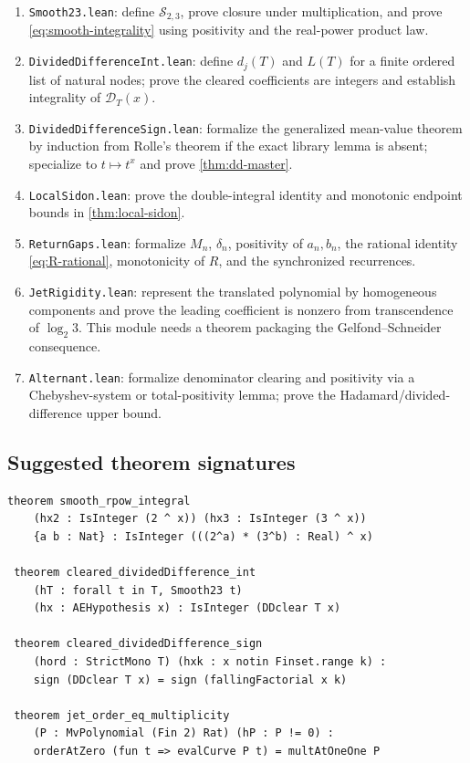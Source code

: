 \documentclass[11pt]{article}
\theoremstyle{definition}
\theoremstyle{remark}
\newcommand{\Ssmooth}{\mathcal S_{2,3}}
\begin{document}
\begin{enumerate}
\item \texttt{Smooth23.lean}: define $\Ssmooth$, prove closure under multiplication, and prove \eqref{eq:smooth-integrality} using positivity and the real-power product law.
\item \texttt{DividedDifferenceInt.lean}: define $d_j(T)$ and $L(T)$ for a finite ordered list of natural nodes; prove the cleared coefficients are integers and establish integrality of $\mathscr D_T(x)$.
\item \texttt{DividedDifferenceSign.lean}: formalize the generalized mean-value theorem by induction from Rolle's theorem if the exact library lemma is absent; specialize to $t\mapsto t^x$ and prove \cref{thm:dd-master}.
\item \texttt{LocalSidon.lean}: prove the double-integral identity and monotonic endpoint bounds in \cref{thm:local-sidon}.
\item \texttt{ReturnGaps.lean}: formalize $M_n$, $\delta_n$, positivity of $a_n,b_n$, the rational identity \eqref{eq:R-rational}, monotonicity of $R$, and the synchronized recurrences.
\item \texttt{JetRigidity.lean}: represent the translated polynomial by homogeneous components and prove the leading coefficient is nonzero from transcendence of $\log_2 3$. This module needs a theorem packaging the Gelfond--Schneider consequence.
\item \texttt{Alternant.lean}: formalize denominator clearing and positivity via a Chebyshev-system or total-positivity lemma; prove the Hadamard/divided-difference upper bound.
\end{enumerate}

\subsection{Suggested theorem signatures}

\begin{lstlisting}[language={},basicstyle=\ttfamily\small,breaklines=true]
theorem smooth_rpow_integral
    (hx2 : IsInteger (2 ^ x)) (hx3 : IsInteger (3 ^ x))
    {a b : Nat} : IsInteger (((2^a) * (3^b) : Real) ^ x)

 theorem cleared_dividedDifference_int
    (hT : forall t in T, Smooth23 t)
    (hx : AEHypothesis x) : IsInteger (DDclear T x)

 theorem cleared_dividedDifference_sign
    (hord : StrictMono T) (hxk : x notin Finset.range k) :
    sign (DDclear T x) = sign (fallingFactorial x k)

 theorem jet_order_eq_multiplicity
    (P : MvPolynomial (Fin 2) Rat) (hP : P != 0) :
    orderAtZero (fun t => evalCurve P t) = multAtOneOne P
\end{lstlisting}
\end{document}
